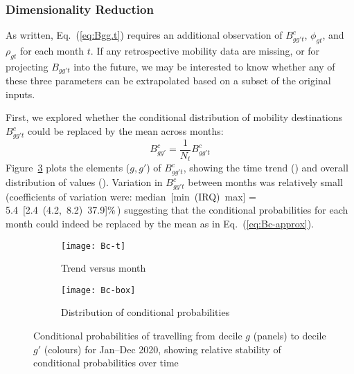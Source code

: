 \subsubsection{Dimensionality Reduction}\label{app.mob.reduce}
As written, Eq.~(\ref{eq:Bgg.t}) requires an additional observation of
$B^c_{gg't}$, $\phi_{gt}$, and $\rho_{gt}$ for each month $t$.
If any retrospective mobility data are missing,
or for projecting $B_{gg't}$ into the future,
we may be interested to know whether any of these three parameters
can be extrapolated based on a subset of the original inputs.
\par
First, we explored whether
the conditional distribution of mobility destinations $B^c_{gg't}$
could be replaced by the mean across months:
\begin{equation}\label{eq:Bc-approx}
  B^c_{gg'} = \frac{1}{N_t} B^c_{gg't}
\end{equation}
Figure~\ref{fig:Bc} plots the elements ($g,g'$) of $B^c_{gg't}$,
showing the time trend ()
and overall distribution of values ().
Variation in $B^c_{gg't}$ between months was relatively small
(coefficients of variation were:
median~[min~(IRQ)~max] = 5.4~[2.4~(4.2,~8.2)~37.9]\%\,)
suggesting that the conditional probabilities for each month
could indeed be replaced by the mean as in Eq.~(\ref{eq:Bc-approx}).
\begin{figure}[ht]
  \begin{subfigure}{\linewidth}
    \texttt{[image: Bc-t]}
    \caption{Trend versus month}
    \label{fig:Bc-t}
  \end{subfigure}
  \begin{subfigure}{\linewidth}
    \texttt{[image: Bc-box]}
    \caption{Distribution of conditional probabilities}
    \label{fig:Bc-box}
  \end{subfigure}
  \caption{Conditional probabilities of
    travelling from decile $g$ (panels) to decile $g'$ (colours) for Jan--Dec 2020,
    showing relative stability of conditional probabilities over time}
  \label{fig:Bc}
\end{figure}
